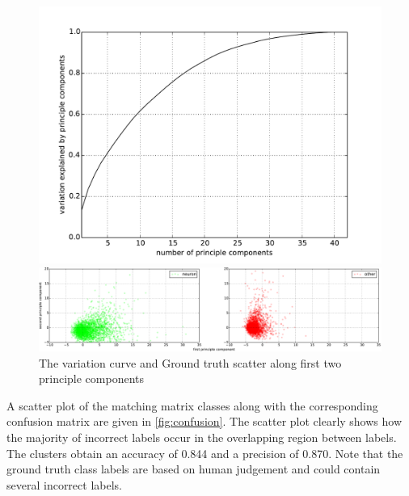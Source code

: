 \documentclass[10pt]{article}
\begin{document}
\begin{figure}[h]
    \centering

    \begin{minipage}{0.25\textwidth}
      \centering
      \includegraphics[width=\textwidth]{figs/variation.pdf}
    \end{minipage}
    \begin{minipage}{0.70\textwidth}
      \centering
      \vspace{2mm}
      \includegraphics[width=\textwidth]{figs/PCA_scatter_cropped.pdf}
    \end{minipage}
    \caption{\footnotesize The variation curve and Ground truth scatter along first two principle components}
    \label{fig:variation}
\end{figure}

A scatter plot of the matching matrix classes along with the corresponding confusion matrix are given in \cref{fig:confusion}. The scatter plot clearly shows how the majority of incorrect labels occur in the overlapping region between labels. The clusters obtain an accuracy of \num{0.844} and a precision of \num{0.870}. Note that the ground truth class labels are based on human judgement and could contain several incorrect labels.
\end{document}

